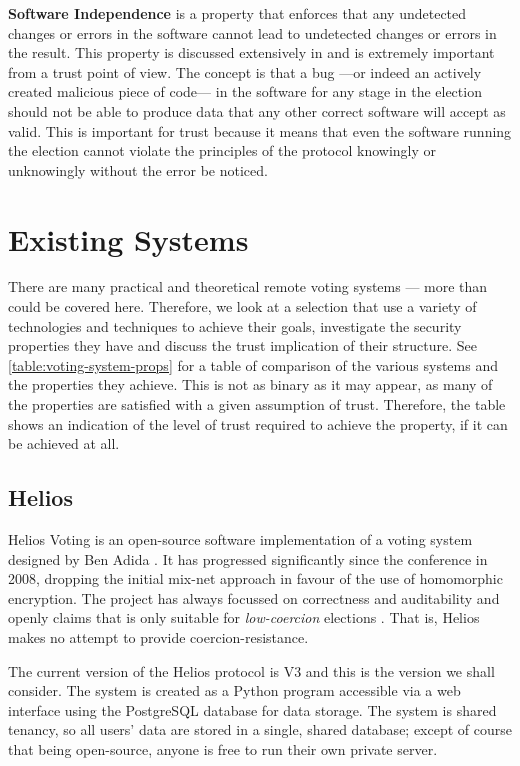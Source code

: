 \textbf{Software Independence} is a property that enforces that any undetected changes or errors in the software cannot lead to undetected changes or errors in the result. This property is discussed extensively in \cite{rivestNotionSoftwareIndependence2008} and is extremely important from a trust point of view. The concept is that a bug ---or indeed an actively created malicious piece of code--- in the software for any stage in the election should not be able to produce data that any other correct software will accept as valid. This is important for trust because it means that even the software running the election cannot violate the principles of the protocol knowingly or unknowingly without the error be noticed.

\section{Existing Systems}
\label{ch:ev:existing}

There are many practical and theoretical remote voting systems --- more than could be covered here. Therefore, we look at a selection that use a variety of technologies and techniques to achieve their goals, investigate the security properties they have and discuss the trust implication of their structure. See \autoref{table:voting-system-props} for a table of comparison of the various systems and the properties they achieve. This is not as binary as it may appear, as many of the properties are satisfied with a given assumption of trust. Therefore, the table shows an indication of the level of trust required to achieve the property, if it can be achieved at all.

\subsection{Helios}

Helios Voting is an open-source software implementation of a voting system designed by Ben Adida \cite{adidaHeliosWebBasedOpenAudit2008}. It has progressed significantly since the conference in 2008, dropping the initial mix-net approach in favour of the use of homomorphic encryption. The project has always focussed on correctness and auditability and openly claims that is only suitable for \emph{low-coercion} elections \cite{HeliosVotingFAQ}. That is, Helios makes no attempt to provide coercion-resistance.

The current version of the Helios protocol is V3 and this is the version we shall consider. The system is created as a Python program accessible via a web interface using the PostgreSQL database for data storage. The system is shared tenancy, so all users' data are stored in a single, shared database; except of course that being open-source, anyone is free to run their own private server.

